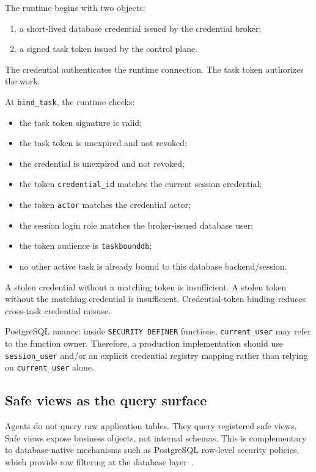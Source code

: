\documentclass[
]{article}
\providecommand{\tightlist}{%
  \setlength{\itemsep}{0pt}\setlength{\parskip}{0pt}}
\begin{document}
The runtime begins with two objects:

\begin{enumerate}
\def\labelenumi{\arabic{enumi}.}
\tightlist
\item
  a short-lived database credential issued by the credential broker;
\item
  a signed task token issued by the control plane.
\end{enumerate}

The credential authenticates the runtime connection. The task token
authorizes the work.

At \texttt{bind\_task}, the runtime checks:

\begin{itemize}
\tightlist
\item
  the task token signature is valid;
\item
  the task token is unexpired and not revoked;
\item
  the credential is unexpired and not revoked;
\item
  the token \texttt{credential\_id} matches the current session
  credential;
\item
  the token \texttt{actor} matches the credential actor;
\item
  the session login role matches the broker-issued database user;
\item
  the token audience is \texttt{taskbounddb};
\item
  no other active task is already bound to this database
  backend/session.
\end{itemize}

A stolen credential without a matching token is insufficient. A stolen
token without the matching credential is insufficient. Credential-token
binding reduces cross-task credential misuse.

PostgreSQL nuance: inside \texttt{SECURITY\ DEFINER} functions,
\texttt{current\_user} may refer to the function owner. Therefore, a
production implementation should use \texttt{session\_user} and/or an
explicit credential registry mapping rather than relying on
\texttt{current\_user} alone.

\hypertarget{safe-views-as-the-query-surface}{%
\subsection{Safe views as the query
surface}\label{safe-views-as-the-query-surface}}

Agents do not query raw application tables. They query registered safe
views. Safe views expose business objects, not internal schemas. This is
complementary to database-native mechanisms such as PostgreSQL
row-level security policies, which provide row filtering at the database
layer~\cite{postgresql2026rowsecurity}.
\end{document}
